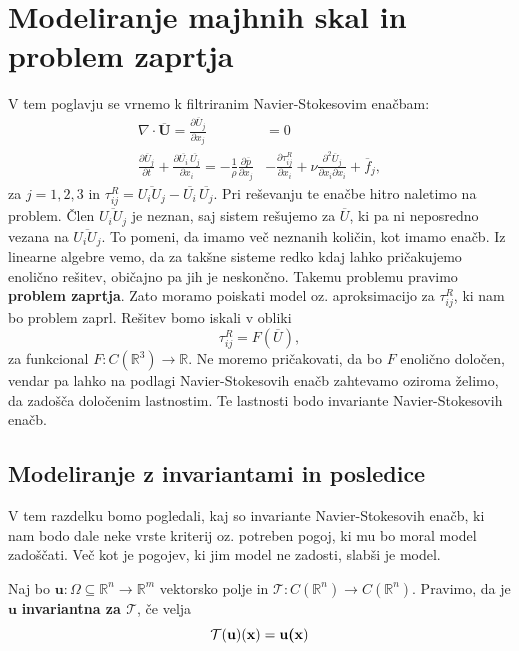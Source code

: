 \documentclass[mat2, tisk]{fmfdelo}
\newcommand{\R}{\mathbb R}
\newcommand{\bd}{\textbf}
\begin{document}
\section{Modeliranje majhnih skal in problem zaprtja}
V tem poglavju se vrnemo k filtriranim Navier-Stokesovim enačbam: 
\begin{align*}
  \nabla\cdot\overline{\bd{U}} = \frac{\partial \overline{U}_j}{\partial x_j} &= 0\\[2mm]
  \frac{\partial \overline{U}_j}{\partial t} + \frac{\partial \overline{U_i}\, \overline{U_j}}{\partial x_i} = -\frac{1}{\rho} \frac{\partial \overline{p}}{\partial x_j}& 
- \frac{\partial \tau_{ij}^{R}}{\partial x_i}+ \nu \frac{\partial^2 \overline{U}_j}{\partial x_i \partial x_i} + \overline{f}_j,
\end{align*}
za $j=1, 2, 3$ in $\tau_{ij}^R = \overline{U_i U_j} - \overline{U_i} \,\overline{U_j}$. 
Pri reševanju te enačbe hitro naletimo na problem. Člen $\overline{U_i U_j}$ 
je neznan, saj sistem rešujemo za $\overline{U}$, ki pa ni neposredno vezana na $\overline{U_i U_j}$. 
To pomeni, da imamo več neznanih količin, kot imamo enačb. Iz linearne algebre 
vemo, da za takšne sisteme redko kdaj lahko pričakujemo enolično rešitev, 
običajno pa jih je neskončno. Takemu problemu pravimo \bd{problem zaprtja}.
Zato moramo poiskati model oz. aproksimacijo za $\tau_{ij}^R$, ki nam bo problem 
zaprl. Rešitev bomo iskali v obliki 
\begin{equation}
\tau_{ij}^R = F(\overline{U}), 
\end{equation}
za funkcional $F: C(\R^3) \rightarrow \R$. Ne moremo pričakovati, da 
bo $F$ enolično določen, vendar pa lahko na podlagi Navier-Stokesovih enačb zahtevamo oziroma želimo,
da zadošča določenim lastnostim. Te lastnosti bodo invariante Navier-Stokesovih enačb.

\subsection{Modeliranje z invariantami in posledice}

V tem razdelku bomo pogledali, kaj so invariante Navier-Stokesovih 
enačb, ki nam bodo dale neke vrste kriterij oz. potreben pogoj, ki 
mu bo moral model zadoščati. Več kot je pogojev, ki jim model 
ne zadosti, slabši je model.

\begin{definicija}
Naj bo $\bd{u}: \Omega \subseteq \R^n \rightarrow \R^m$ vektorsko polje 
in $\mathcal{T}:C(\R^n) \rightarrow C(\R^n)$. Pravimo, da je $\bd{u}$
\bd{invariantna za $\mathcal{T}$}, če velja
\begin{equation}
\mathcal{T}(\bd{u})(\bd{x}) = \bd{u(\bd{x}})
\end{equation}
\end{definicija}
\end{document}
